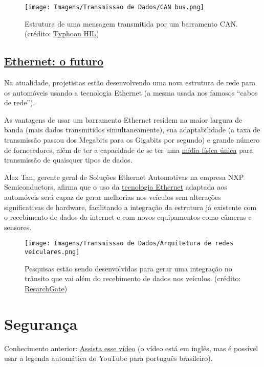 \documentclass{article}
\begin{document}
\begin{figure}[ht]
    \centering
    \texttt{[image: Imagens/Transmissao de Dados/CAN bus.png]}
    \caption{Estrutura de uma mensagem transmitida por um barramento CAN. (crédito: \href{https://www.typhoon-hil.com/documentation/typhoon-hil-schematic-editor-library/References/can_bus_protocol.html}{Typhoon HIL})}
\end{figure}


\newpage


\subsection*{\underline{Ethernet: o futuro}}

\hspace{4pt} Na atualidade, projetistas estão desenvolvendo uma nova estrutura de rede para os automóveis usando a tecnologia Ethernet (a mesma usada nos famosos “cabos de rede”).

As vantagens de usar um barramento Ethernet residem na maior largura de banda (mais dados transmitidos simultaneamente), sua adaptabilidade (a taxa de transmissão passou dos Megabits para os Gigabits por segundo) e grande número de fornecedores, além de ter a capacidade de se ter uma \href{https://www.youtube.com/watch?v=JTv8p7VFxGE}{mídia física única} para transmissão de quaisquer tipos de dados.

Alex Tan, gerente geral de Soluções Ethernet Automotivas na empresa NXP Semiconductors, afirma que o uso da \href{https://www.youtube.com/watch?v=SpfG-LwO8MQ}{tecnologia Ethernet} adaptada aos automóveis será capaz de gerar melhorias nos veículos sem alterações significativas de hardware, facilitando a integração da estrutura já existente com o recebimento de dados da internet e com novos equipamentos como câmeras e sensores.


\begin{figure}[ht]
    \centering
    \texttt{[image: Imagens/Transmissao de Dados/Arquitetura de redes veiculares.png]}
    \caption{Pesquisas estão sendo desenvolvidas para gerar uma integração no trânsito que vai além do recebimento de dados nos veículos. (crédito: \href{https://www.researchgate.net/figure/Vehicular-network-architecture_fig1_318993172}{ResarchGate})}
\end{figure}


\newpage

\section*{Segurança}
Conhecimento anterior: \href{https://www.youtube.com/watch?v=PLiE0Nr8VOE}{Assista esse vídeo} (o vídeo está em inglês, mas é possível usar a legenda automática do YouTube para português brasileiro).
\end{document}
